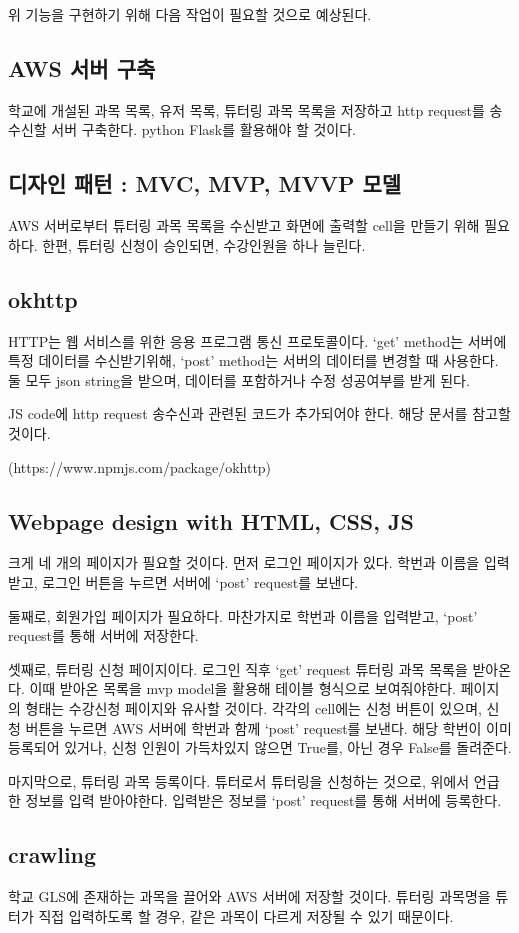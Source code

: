\documentclass{lxaiproposal}
\begin{document}
위 기능을 구현하기 위해 다음 작업이 필요할 것으로 예상된다.
\subsection{AWS 서버 구축}
학교에 개설된 과목 목록, 유저 목록, 튜터링 과목 목록을 저장하고 http request를 송수신할 서버 구축한다. python Flask를 활용해야 할 것이다.

\subsection{디자인 패턴 : MVC, MVP, MVVP 모델}
AWS 서버로부터 튜터링 과목 목록을 수신받고 화면에 출력할 cell을 만들기 위해 필요하다. 한편, 튜터링 신청이 승인되면, 수강인원을 하나 늘린다.

\subsection{okhttp}
HTTP는 웹 서비스를 위한 응용 프로그램 통신 프로토콜이다.
`get' method는 서버에 특정 데이터를 수신받기위해, `post' method는 서버의 데이터를 변경할 때 사용한다. 
둘 모두 json string을 받으며, 데이터를 포함하거나 수정 성공여부를 받게 된다. 

JS code에 http request 송수신과 관련된 코드가 추가되어야 한다. 해당 문서를 참고할 것이다.

(https://www.npmjs.com/package/okhttp)

\subsection{Webpage design with HTML, CSS, JS}
크게 네 개의 페이지가 필요할 것이다. 
먼저 로그인 페이지가 있다. 학번과 이름을 입력받고, 로그인 버튼을 누르면 서버에 `post' request를 보낸다.

둘째로, 회원가입 페이지가 필요하다. 마찬가지로 학번과 이름을 입력받고, `post' request를 통해 서버에 저장한다.

셋째로, 튜터링 신청 페이지이다. 로그인 직후 `get' request 튜터링 과목 목록을 받아온다. 이때 받아온 목록을 mvp model을 활용해 테이블 형식으로 보여줘야한다. 
페이지의 형태는 수강신청 페이지와 유사할 것이다.
각각의 cell에는 신청 버튼이 있으며, 신청 버튼을 누르면 AWS 서버에 학번과 함께 `post' request를 보낸다. 
해당 학번이 이미 등록되어 있거나, 신청 인원이 가득차있지 않으면 True를, 아닌 경우 False를 돌려준다.

마지막으로, 튜터링 과목 등록이다. 튜터로서 튜터링을 신청하는 것으로, 위에서 언급한 정보를 입력 받아야한다. 입력받은 정보를 `post' request를 통해 서버에 등록한다. 

\subsection{crawling}
학교 GLS에 존재하는 과목을 끌어와 AWS 서버에 저장할 것이다. 튜터링 과목명을 튜터가 직접 입력하도록 할 경우, 같은 과목이 다르게 저장될 수 있기 때문이다. 

% 
% 

\end{document}
